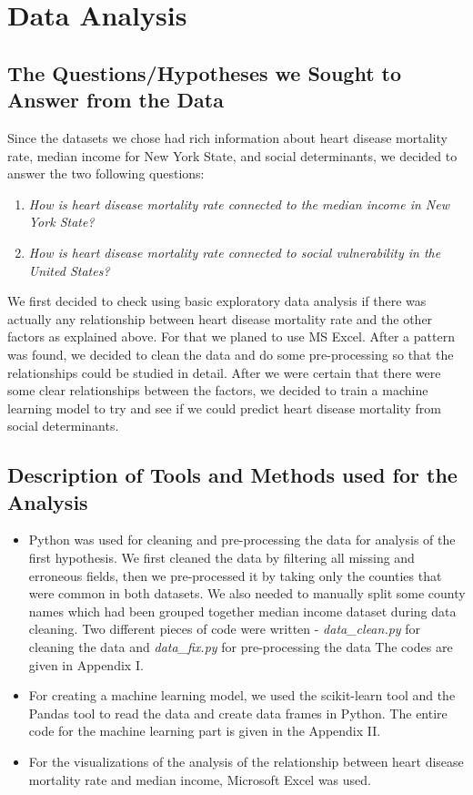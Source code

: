 \documentclass[journal,12pt,onecolumn]{IEEEtran}
\begin{document}
\section{Data Analysis}

\subsection{The Questions/Hypotheses we Sought to Answer from the Data}
Since the datasets we chose had rich information about heart disease mortality rate, median income for New York State, and social determinants, we decided to answer the two following questions:
\begin{enumerate}
\item \emph{How is heart disease mortality rate connected to the median income in New York State?}
\item \emph{How is heart disease mortality rate connected to social vulnerability in the United States?}
\end{enumerate} 

We first decided to check using basic exploratory data analysis if there was actually any relationship between heart disease mortality rate and the other factors as explained above.  
For that we planed to use MS Excel.
After a pattern was found, we decided to clean the data and do some pre-processing so that the relationships could be studied in detail.
After we were certain that there were some clear relationships between the factors, we decided to train a machine learning model to try and see if we could predict heart disease mortality from social determinants.

\subsection{Description of Tools and Methods used for the Analysis}
\begin{itemize}
\item Python was used for cleaning and pre-processing the data for analysis of the first hypothesis.
We first cleaned the data by filtering all missing and erroneous fields, then we pre-processed it by taking only the counties that were common in both datasets.
We also needed to manually split some county names which had been grouped together median income dataset during data cleaning.
Two different pieces of code were written - \emph{data\_clean.py} for cleaning the data and \emph{data\_fix.py} for pre-processing the data
The codes are given in Appendix I.

\item For creating a machine learning model, we used the scikit-learn tool and the Pandas tool to read the data and create data frames in Python.
The entire code for the machine learning part is given in the Appendix II.

\item For the visualizations of the analysis of the relationship between heart disease mortality rate and median income, Microsoft Excel was used.
\end{itemize}
\end{document}
